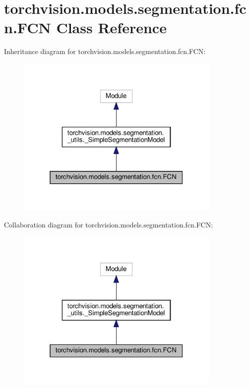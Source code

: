 \hypertarget{classtorchvision_1_1models_1_1segmentation_1_1fcn_1_1FCN}{}\section{torchvision.\+models.\+segmentation.\+fcn.\+F\+CN Class Reference}
\label{classtorchvision_1_1models_1_1segmentation_1_1fcn_1_1FCN}


Inheritance diagram for torchvision.\+models.\+segmentation.\+fcn.\+F\+CN\+:
\nopagebreak
\begin{figure}[H]
\begin{center}
\leavevmode
\includegraphics[width=280pt]{classtorchvision_1_1models_1_1segmentation_1_1fcn_1_1FCN__inherit__graph}
\end{center}
\end{figure}


Collaboration diagram for torchvision.\+models.\+segmentation.\+fcn.\+F\+CN\+:
\nopagebreak
\begin{figure}[H]
\begin{center}
\leavevmode
\includegraphics[width=280pt]{classtorchvision_1_1models_1_1segmentation_1_1fcn_1_1FCN__coll__graph}
\end{center}
\end{figure}
